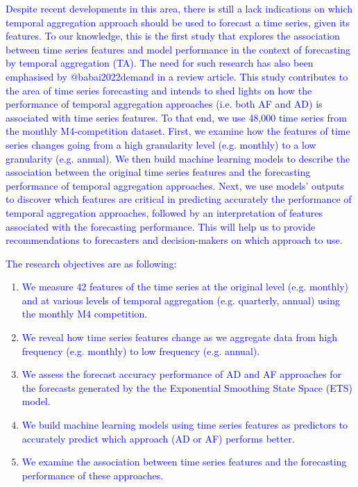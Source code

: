 \documentclass[preprint, 3p,
authoryear]{elsarticle} %
\begin{document}
\textcolor{blue}{Despite recent developments in this area, there is still a lack indications on which temporal aggregation approach should be used to forecast a time series, given its features. To our knowledge, this is the first study that explores the association between time series features and model performance in the context of forecasting by temporal aggregation (TA). The need for such research has also
been emphasised by @babai2022demand in a review article. This study contributes to the area of time series forecasting and intends to shed lights on how the performance of temporal aggregation approaches (i.e. both AF and AD) is associated with time series features. To that end, we use 48,000 time series from the monthly M4-competition dataset. First, we examine how the features of time series changes going from a high granularity level (e.g. monthly) to a low granularity (e.g. annual). We then build machine learning models to describe the association between the original time series features and the forecasting performance of temporal aggregation approaches. Next, we use models' outputs to discover which features are critical in predicting accurately the performance of temporal aggregation approaches, followed by an interpretation of features associated with the forecasting performance. This will help us to provide recommendations to forecasters and decision-makers on which approach to use.}

\textcolor{blue}{The research objectives are as following:}

\begin{enumerate}
\def\labelenumi{\arabic{enumi}.}
\item
  \textcolor{blue}{We measure 42 features of the time series at the original level (e.g. monthly) and at various levels of temporal aggregation (e.g. quarterly, annual) using the monthly M4 competition.}
\item
  \textcolor{blue}{We reveal how time series features change as we aggregate data from high frequency (e.g. monthly) to low frequency (e.g. annual).}
\item
  \textcolor{blue}{We assess the forecast accuracy performance of AD and AF approaches for the forecasts generated by the the Exponential Smoothing State Space (ETS) model.}
\item
  \textcolor{blue}{We build machine learning models using time series features as predictors to accurately predict which approach (AD or AF) performs better.}
\item
  \textcolor{blue}{We examine the association between time series features and the forecasting performance of these approaches.}
\end{enumerate}
\end{document}
